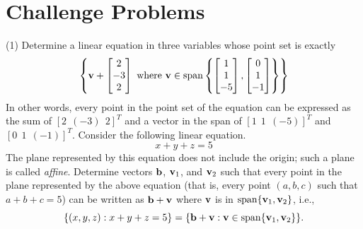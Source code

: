 \section{Challenge Problems}

\begin{tasks}[resume, style=enumerate](1)
\task
  Determine a linear equation in three variables whose point set is exactly
  \begin{align*}
    \left\{
    \mathbf v +
    \begin{bmatrix} 2 \\ -3 \\ 2 \end{bmatrix}
    \ \text{where} \
    \mathbf v \in
    \operatorname{\mathrm{span}}
    \left\{
    \begin{bmatrix} 1 \\ 1 \\ -5 \end{bmatrix},
    \begin{bmatrix} 0 \\ 1 \\ -1 \end{bmatrix}
    \right\}
    \right\}
  \end{align*}
  In other words, every point in the point set of the equation can be
  expressed as the sum of $[2 \ \ (-3) \ \ 2]^T$ and a vector in the
  span of $[1 \ \ 1 \ \ (-5)]^T$ and $[0 \ \ 1 \ \ (-1)]^T$.
\task
  Consider the following linear equation.
  \begin{displaymath}
    x + y + z = 5
  \end{displaymath}
  The plane represented by this equation does not include the origin;
  such a plane is called \textit{affine}.  Determine vectors $\mathbf b$,
  $\mathbf v_1$, and $\mathbf v_2$ such that every point in the plane represented
  by the above equation (that is, every point $(a, b, c)$ such that $a
  + b + c = 5$) can be written as $\mathbf b + \mathbf v$ where $\mathbf v$ is in
  $\operatorname{\mathrm{span}} \{\mathbf v_1, \mathbf v_2\}$, i.e.,
  \begin{displaymath}
    \{(x, y, z) : x + y + z = 5\}
    = \{\mathbf b + \mathbf v : \mathbf v \in \operatorname{\mathrm{span}}\{\mathbf v_1, \mathbf v_2\}\}.
  \end{displaymath}
\end{tasks}
